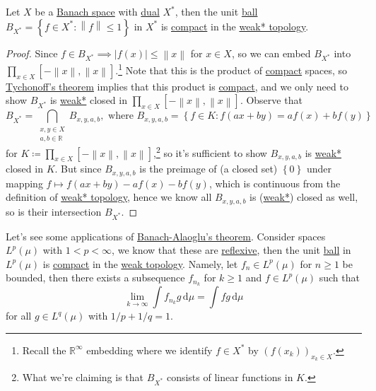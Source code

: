 \begin{theorem}\label{thm:Banach-Alaoglu}
	Let \(X\) be a \hyperref[def:Banach-space]{Banach space} with \hyperref[def:dual-space]{dual} \(X^{\ast} \), then the unit \hyperref[def:ball]{ball} \(B_{X^{\ast} }= \left\{ f\in X^{\ast} \colon \left\lVert f\right\rVert \leq 1 \right\}\) in \(X^{\ast} \) is \hyperref[def:compact]{compact} in the \hyperref[def:weak*-topology]{weak* topology}.
\end{theorem}
\begin{proof}
	Since \(f\in B_{X^{\ast} }\implies \left\vert f(x) \right\vert \leq \left\lVert x\right\rVert\) for \(x\in X\), so we can embed \(B_{X^{\ast} }\) into \(\prod_{x\in X} [-\left\lVert x\right\rVert , \left\lVert x\right\rVert]\).\footnote{Recall the \(\mathbb{R} ^{\infty} \) embedding where we identify \(f\in X^{\ast} \) by \((f(x_k))_{x_k\in X}\).} Note that this is the product of \hyperref[def:compact]{compact} spaces, so \hyperref[thm:Tychonoff]{Tychonoff's theorem} implies that this product is \hyperref[def:compact]{compact}, and we only need to show \(B_{X^{\ast} }\) is \hyperref[def:weak*-topology]{weak*} closed in \(\prod_{x\in X} [-\left\lVert x\right\rVert , \left\lVert x\right\rVert]\). Observe that
	\[
		B_{X^{\ast} } = \bigcap_{\substack{x, y\in X\\ a, b\in \mathbb{R} }}B_{x, y, a, b}, \text{ where } B_{x, y, a, b} = \left\{ f\in K\colon f(ax+by) = af(x) + bf(y) \right\}
	\]
	for \(K \coloneqq \prod_{x\in X}[-\left\lVert x\right\rVert , \left\lVert x\right\rVert ]\),\footnote{What we're claiming is that \(B_{X^{\ast} }\) consists of linear functions in \(K\).} so it's sufficient to show \(B_{x, y, a, b}\) is \hyperref[def:weak*-topology]{weak*} closed in \(K\). But since \(B_{x, y, a, b}\) is the preimage of (a closed set) \(\left\{ 0 \right\} \) under mapping \(f \mapsto f(ax+by) - af(x) - bf(y)\), which is continuous from the definition of \hyperref[def:weak*-topology]{weak* topology}, hence we know all \(B_{x, y, a, b}\) is (\hyperref[def:weak*-topology]{weak*}) closed as well, so is their intersection \(B_{X^{\ast} }\).
\end{proof}

Let's see some applications of \hyperref[thm:Banach-Alaoglu]{Banach-Alaoglu's theorem}. Consider spaces \(L^p(\mu )\) with \(1 < p < \infty\), we know that these are \hyperref[def:reflexive-space]{reflexive}, then the unit \hyperref[def:ball]{ball} in \(L^p(\mu )\) is \hyperref[def:compact]{compact} in the \hyperref[def:weak-topology]{weak topology}. Namely, let \(f_n\in L^p(\mu )\) for \(n \geq 1\) be bounded, then there exists a subsequence \(f_{n_k}\) for \(k\geq 1\) and \(f\in L^p(\mu )\) such that
\[
	\lim_{k \to \infty} \int f_{n_k}g\,\mathrm{d} \mu = \int fg\,\mathrm{d} \mu
\]
for all \(g\in L^{q}(\mu )\) with \(1 / p + 1 / q = 1\).

